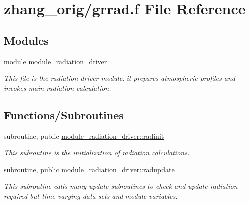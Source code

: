 \hypertarget{zhang__orig_2grrad_8f}{}\section{zhang\+\_\+orig/grrad.f File Reference}
\label{zhang__orig_2grrad_8f}
\subsection*{Modules}
\begin{DoxyCompactItemize}
\item 
module \hyperlink{namespacemodule__radiation__driver}{module\+\_\+radiation\+\_\+driver}
\begin{DoxyCompactList}\small\item\em This file is the radiation driver module. it prepares atmospheric profiles and invokes main radiation calculation. \end{DoxyCompactList}\end{DoxyCompactItemize}
\subsection*{Functions/\+Subroutines}
{\bf }\par
\begin{DoxyCompactItemize}
\item 
subroutine, public \hyperlink{namespacemodule__radiation__driver_af039e0c23dc6ab8d2f8b1c1c796ac0da}{module\+\_\+radiation\+\_\+driver\+::radinit}                                                                                             
\begin{DoxyCompactList}\small\item\em This subroutine is the initialization of radiation calculations. \end{DoxyCompactList}\end{DoxyCompactItemize}

{\bf }\par
\begin{DoxyCompactItemize}
\item 
subroutine, public \hyperlink{namespacemodule__radiation__driver_a47f0e4defe607fbfc751f6c9274f459a}{module\+\_\+radiation\+\_\+driver\+::radupdate}                                                                                         
\begin{DoxyCompactList}\small\item\em This subroutine calls many update subroutines to check and update radiation required but time varying data sets and module variables. \end{DoxyCompactList}\end{DoxyCompactItemize}

